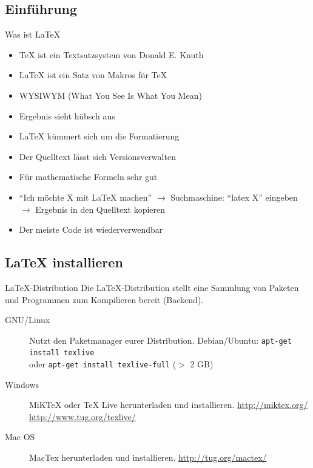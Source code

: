 \documentclass{beamer}
\begin{document}
		\subsection{Einführung}
		\begin{frame}{Was ist \LaTeX{}}
			\begin{itemize}
				\item \TeX{} ist ein Textsatzsystem von Donald E. Knuth
				\item \LaTeX{} ist ein Satz von Makros für \TeX
				\item WYSIWYM (What You See Is What You Mean)
			\end{itemize}
			\vspace{0.1cm}
			\begin{itemize}
				\item Ergebnis sieht hübsch aus
				\item \LaTeX{} kümmert sich um die Formatierung
				\item Der Quelltext lässt sich Versionsverwalten
				\item Für mathematische Formeln sehr gut
				\item ``Ich möchte X mit \LaTeX{} machen'' $\rightarrow$
				Suchmaschine: ``latex X'' eingeben $\rightarrow$
				Ergebnis in den Quelltext kopieren
				\item Der meiste Code ist wiederverwendbar
			\end{itemize}
		\end{frame}
		
		\subsection{\LaTeX{} installieren}
		\begin{frame}{\LaTeX-Distribution}
Die \LaTeX-Distribution stellt eine Sammlung von Paketen und Programmen zum Kompilieren bereit (Backend). \\
			\begin{description}
				\item[GNU/Linux] Nutzt den Paketmanager eurer Distribution. Debian/Ubuntu: \texttt{apt-get install texlive} \\
				oder \texttt{apt-get install texlive-full} (\(>\) 2 GB)
				\item[Windows] MiKTeX  oder TeX Live herunterladen und installieren. \url{http://miktex.org/} \url{http://www.tug.org/texlive/}
				\item[Mac OS] MacTex herunterladen und installieren. \url{http://tug.org/mactex/} 
			\end{description}
			\end{frame}	
			
\end{document}

